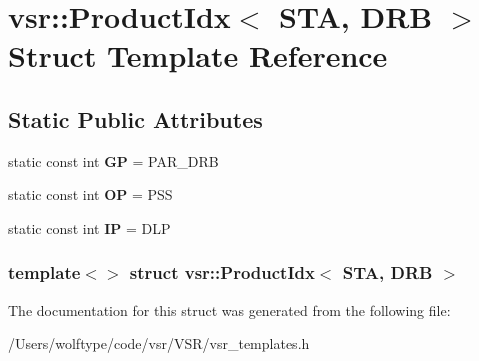 \hypertarget{structvsr_1_1_product_idx_3_01_s_t_a_00_01_d_r_b_01_4}{\section{vsr\-:\-:Product\-Idx$<$ S\-T\-A, D\-R\-B $>$ Struct Template Reference}
\label{structvsr_1_1_product_idx_3_01_s_t_a_00_01_d_r_b_01_4}
}
\subsection*{Static Public Attributes}
\begin{DoxyCompactItemize}
\item 
\hypertarget{structvsr_1_1_product_idx_3_01_s_t_a_00_01_d_r_b_01_4_a47e453953d93e70e3c77b9e3e211febd}{static const int {\bfseries G\-P} = P\-A\-R\-\_\-\-D\-R\-B}\label{structvsr_1_1_product_idx_3_01_s_t_a_00_01_d_r_b_01_4_a47e453953d93e70e3c77b9e3e211febd}

\item 
\hypertarget{structvsr_1_1_product_idx_3_01_s_t_a_00_01_d_r_b_01_4_a746d41a98093f6fbb28a792dbc8a3846}{static const int {\bfseries O\-P} = P\-S\-S}\label{structvsr_1_1_product_idx_3_01_s_t_a_00_01_d_r_b_01_4_a746d41a98093f6fbb28a792dbc8a3846}

\item 
\hypertarget{structvsr_1_1_product_idx_3_01_s_t_a_00_01_d_r_b_01_4_af64c4735c555badaef6e86d678d0abdf}{static const int {\bfseries I\-P} = D\-L\-P}\label{structvsr_1_1_product_idx_3_01_s_t_a_00_01_d_r_b_01_4_af64c4735c555badaef6e86d678d0abdf}

\end{DoxyCompactItemize}
\subsubsection*{template$<$$>$ struct vsr\-::\-Product\-Idx$<$ S\-T\-A, D\-R\-B $>$}



The documentation for this struct was generated from the following file\-:\begin{DoxyCompactItemize}
\item 
/\-Users/wolftype/code/vsr/\-V\-S\-R/vsr\-\_\-templates.\-h\end{DoxyCompactItemize}
